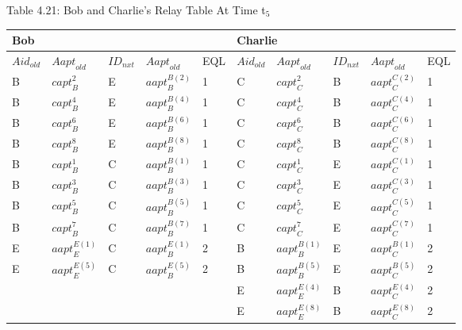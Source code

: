 \noindent 

\noindent 

\noindent 

\noindent Table 4.21: Bob and Charlie's Relay Table At Time t${}_{5}$

\begin{tabular}{|p{0.4in}|p{0.5in}|p{0.3in}|p{0.5in}|p{0.3in}|p{0.4in}|p{0.5in}|p{0.3in}|p{0.5in}|p{0.3in}|} \hline 
\multicolumn{5}{|p{1in}|}{Bob} & \multicolumn{5}{|p{1.9in}|}{Charlie} \\ \hline 
${Aid}_{old}$ & ${Aapt}_{old}$ & ${ID}_{nxt}$ & ${Aapt}_{old}$ & EQL & ${Aid}_{old}$ & ${Aapt}_{old}$ & ${ID}_{nxt}$ & ${Aapt}_{old}$ & EQL \\ \hline 
B & ${capt}^2_B$ & E & ${aapt}^{B\left(2\right)}_B$ & 1 & C & ${capt}^2_C$ & B & ${aapt}^{C\left(2\right)}_C$ & 1 \\ \hline 
B & ${capt}^4_B$ & E & ${aapt}^{B\left(4\right)}_B$ & 1 & C & ${capt}^4_C$ & B & ${aapt}^{C\left(4\right)}_C$ & 1 \\ \hline 
B & ${capt}^6_B$ & E & ${aapt}^{B\left(6\right)}_B$ & 1 & C & ${capt}^6_C$ & B & ${aapt}^{C\left(6\right)}_C$ & 1 \\ \hline 
B & ${capt}^8_B$ & E & ${aapt}^{B\left(8\right)}_B$ & 1 & C & ${capt}^8_C$ & B & ${aapt}^{C\left(8\right)}_C$ & 1 \\ \hline 
B & ${capt}^1_B$ & C & ${aapt}^{B\left(1\right)}_B$ & 1 & C & ${capt}^1_C$ & E & ${aapt}^{C\left(1\right)}_C$ & 1 \\ \hline 
B & ${capt}^3_B$ & C & ${aapt}^{B\left(3\right)}_B$ & 1 & C & ${capt}^3_C$ & E & ${aapt}^{C\left(3\right)}_C$ & 1 \\ \hline 
B & ${capt}^5_B$ & C & ${aapt}^{B\left(5\right)}_B$ & 1 & C & ${capt}^5_C$ & E & ${aapt}^{C\left(5\right)}_C$ & 1 \\ \hline 
B & ${capt}^7_B$ & C & ${aapt}^{B\left(7\right)}_B$ & 1 & C & ${capt}^7_C$ & E & ${aapt}^{C\left(7\right)}_C$ & 1 \\ \hline 
E & ${aapt}^{E\left(1\right)}_E$ & C & ${aapt}^{E\left(1\right)}_B$ & 2 & B & ${aapt}^{B\left(1\right)}_B$ & E & ${aapt}^{B\left(1\right)}_C$ & 2 \\ \hline 
E & ${aapt}^{E\left(5\right)}_E$ & C & ${aapt}^{E\left(5\right)}_B$ & 2 & B & ${aapt}^{B\left(5\right)}_B$ & E & ${aapt}^{B\left(5\right)}_C$ & 2 \\ \hline 
 &  &  &  &  & E & ${aapt}^{E\left(4\right)}_E$ & B & ${aapt}^{E\left(4\right)}_C$ & 2 \\ \hline 
 &  &  &  &  & E & ${aapt}^{E\left(8\right)}_E$ & B & ${aapt}^{E\left(8\right)}_C$ & 2 \\ \hline 
\end{tabular}



